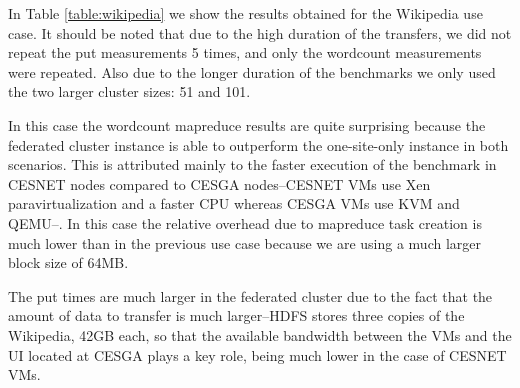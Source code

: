 In Table \ref{table:wikipedia} we show the results obtained for the Wikipedia use case. It should be noted that due to the high duration of the transfers, we did not repeat the put measurements 5 times, and only the wordcount measurements were repeated. Also due to the longer duration of the benchmarks we only used the two larger cluster sizes: 51 and 101.

In this case the wordcount mapreduce results are quite surprising because the federated cluster instance is able to outperform the one-site-only instance in both scenarios. This is attributed mainly to the faster execution of the benchmark in CESNET nodes compared to CESGA nodes--CESNET VMs use Xen paravirtualization and a faster CPU whereas CESGA VMs use KVM and QEMU--. In this case the relative overhead due to mapreduce task creation is much lower than in the previous use case because we are using a much larger block size of 64MB.

The put times are much larger in the federated cluster due to the fact that the amount of data to transfer is much larger--HDFS stores three copies of the Wikipedia, 42GB each, so that the available bandwidth between the VMs and the UI located at CESGA plays a key role, being much lower in the case of CESNET VMs.

